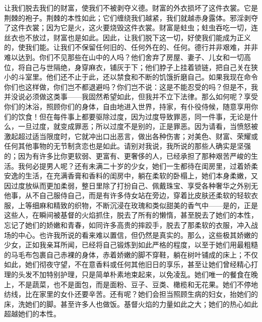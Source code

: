 让我们脱去我们的财富，使我们不被剥夺义德。财富的外衣损坏了这件衣裳。它是荆棘的袍子。荆棘的本性如此；它们缠绕我们越紧，我们就越赤身露体。邪淫剥夺了这件衣裳；因为它是火，这火要烧毁这件衣裳。财富是蛀虫；蛀虫吞吃一切，连丝衣也不放过，财富也是如此。因此，让我们脱下这一切，好使我们能成为正义的，使我们能。让我们不保留任何旧的、任何外在的、任何。德行并非艰难，并非难以达到。你们不见那些在山中的人吗？他们舍弃了房屋、妻子、儿女和一切高位，将自己与世隔绝，身穿麻衣，铺灰于下；他们脖子上挂着锁链，把自己关在狭小的斗室里。他们还不止于此，还以禁食和不断的饥饿折磨自己。如果我现在命令你们也这样做，你们岂不都退避吗？你们岂不说：这是不能忍受的吗？但是不，我并没说必须做这类事——我固然希望如此，但我并不立下法律。那么如何呢？享受你们的沐浴，照顾你们的身体，自由地进入世界，持家，有仆役侍候，随意享用你们的饮食！但在每件事上都要驱除过度，因为过度导致罪恶，同一件事，无论是什么，一旦过度，就变成罪恶；所以过度不是别的，正是罪恶。因为请看，当愤怒被激起超过适当限度时，它就冲出口出恶言，做出各种伤害；对美色、财富、荣耀或任何其他事物的无节制贪恋也是如此。请别对我说，我所说的那些人确实是坚强的；因为有许多比你更软弱、更富有、更奢侈的人，已经承担了那种艰苦严峻的生活。我何必提男人呢？还有未满二十岁的少女，她们一生都待在闺房里，过着娇柔安逸的生活，在充满香膏和香料的闺房中，躺在柔软的卧榻上，她们本身柔嫩，又因过度放纵而更加柔弱，整日里除了打扮自己、佩戴珠宝、享受各种奢华之外别无他事，从不自己服侍自己，而是有许多侍女站在旁边，穿着比皮肤还柔软的轻软衣服，上等细麻和精致的织物，不断沉浸在玫瑰和类似甜美的香气中——是的，正是这些人，在瞬间被基督的火焰抓住，脱去了所有的懒惰，甚至脱去了她们的本性，忘记了她们的娇嫩和青春，如同许多高贵的摔跤手，脱去了那柔软的衣服，冲入战场的中心。也许我所说的看来难以置信，但仍然是真实的。那么，这些极其娇嫩的少女，正如我亲耳所闻，已经将自己锻炼到如此严格的程度，以至于她们用最粗糙的马毛布包裹自己赤裸的身体，赤着娇嫩的脚不穿鞋，躺在树叶铺成的床上；不仅如此，她们彻夜守望，不在意香料或任何其他旧日的享乐，甚至让她们曾经精心打理的头发不加特别护理，只是简单朴素地束起来，以免凌乱。她们唯一的餐食在晚上，不是蔬菜，也不是面包，而是面粉、豆子、豆类、橄榄和无花果。她们不停地纺线，比在家里的女仆还要辛苦。还有呢？她们会担当照顾生病的妇女，抬她们的床，洗她们的脚。甚至许多人也做饭。基督火焰的力量如此之大；她们的热心如此超越她们的本性。\par

